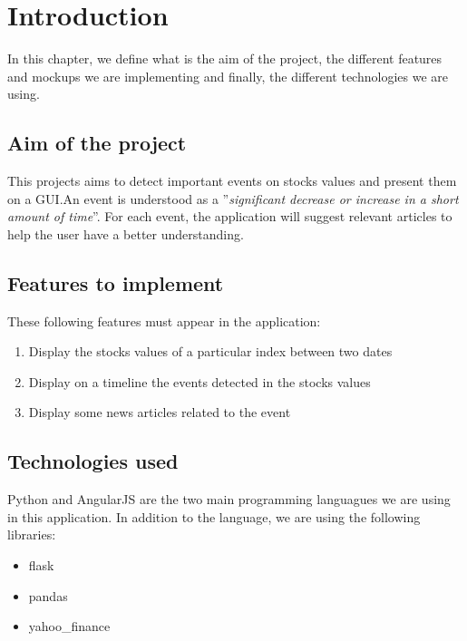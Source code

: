 \chapter{Introduction}
\label{chapter:introduction}
In this chapter, we define what is the aim of the project, the different features and mockups we are implementing and finally, the different technologies we are using.

\section{Aim of the project}
This projects aims to detect important events on stocks values and present them on a GUI.\@ An event is understood as a ''\textit{significant decrease or increase in a short amount of time}''. For each event, the application will suggest relevant articles to help the user have a better understanding.

\section{Features to implement}
These following features must appear in the application:
\begin{enumerate}
    \item Display the stocks values of a particular index between two dates
    \item Display on a timeline the events detected in the stocks values
    \item Display some news articles related to the event
\end{enumerate}

\section{Technologies used}
Python and AngularJS are the two main programming languagues we are using in this application. In addition to the language, we are using the following libraries:
\begin{itemize}
    \item flask
    \item pandas
    \item yahoo\_finance
\end{itemize}
